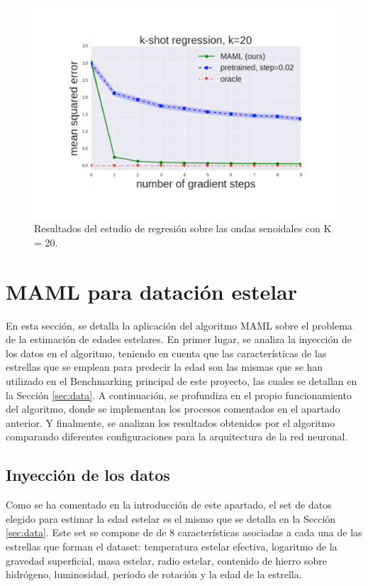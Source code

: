 \begin{figure}[H]
\begin{center}
 \includegraphics[width=0.8\linewidth]{Figuras/MAML/sinusoid_3.pdf}
\end{center}
\caption{Resultados del estudio de regresión sobre las ondas senoidales con K = 20.}
 \label{fig:sinusoid_results_3}
\end{figure}

\section{MAML para datación estelar}
\label{sec:maml}

En esta sección, se detalla la aplicación del algoritmo MAML sobre el problema de la estimación de edades estelares. En primer lugar, se analiza la inyección de los datos en el algoritmo, teniendo en cuenta que las características de las estrellas que se emplean para predecir la edad son las mismas que se han utilizado en el Benchmarking principal de este proyecto, las cuales se detallan en la Sección \ref{sec:data}. A continuación, se profundiza en el propio funcionamiento del algoritmo, donde se implementan los procesos comentados en el apartado anterior. Y finalmente, se analizan los resultados obtenidos por el algoritmo comparando diferentes configuraciones para la arquitectura de la red neuronal.


\subsection{Inyección de los datos} 

Como se ha comentado en la introducción de este apartado, el set de datos elegido para estimar la edad estelar es el mismo que se detalla en la Sección \ref{sec:data}. Este set se compone de de 8 características asociadas a cada una de las estrellas que forman el dataset: temperatura estelar efectiva, logaritmo de la gravedad superficial, masa estelar, radio estelar, contenido de hierro sobre hidrógeno, luminosidad, periodo de rotación y la edad de la estrella.

